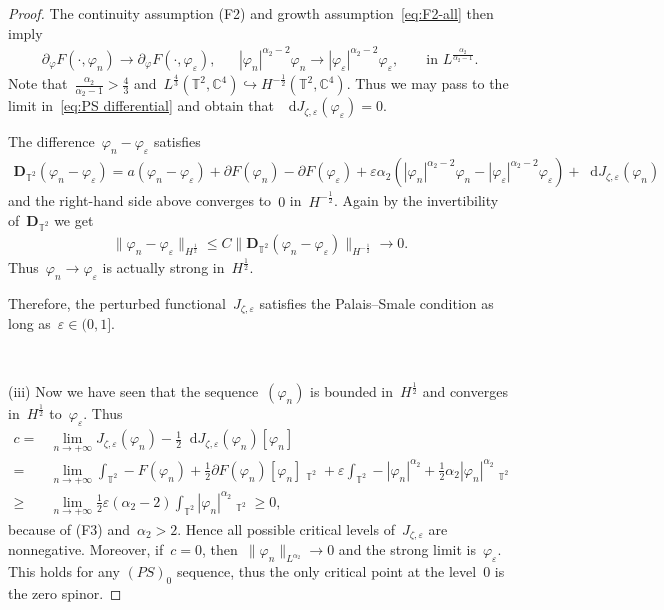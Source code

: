 \documentclass[11pt,final]{amsart}
\newcommand{\p}{\partial}
\newcommand{\C}{\mathbb{C}}
\newcommand{\T}{\mathbb{T}}
\newcommand{\dd}{\mathop{}\!\mathrm{d}}
\newcommand{\eps}{\varepsilon}
\newcommand{\pD}{\mathbf{D}}
\newcommand{\parenthesis}[1]{\left(#1\right)} %
\DeclareMathOperator{\dv}{\dd{vol}}
\begin{document}
\begin{proof}
    The continuity assumption (F2) and growth assumption~\eqref{eq:F2-all} then imply 
    \begin{align}
        \p_\varphi F(\cdot, \varphi_n) \to \p_\varphi F(\cdot,\varphi_\eps), & & 
        |\varphi_n|^{\alpha_2-2}\varphi_n \to |\varphi_\eps|^{\alpha_2-2} \varphi_\eps, & & 
        \mbox{ in  } L^{\frac{\alpha_2}{\alpha_2-1}}.
    \end{align}
    Note that~$\frac{\alpha_2}{\alpha_2-1}>\frac{4}{3}$ and~$L^{\frac{4}{3}}(\T^2,\C^4) \hookrightarrow H^{-\frac{1}{2}}(\T^2,\C^4)$.
    Thus we may pass to the limit in~\eqref{eq:PS differential} and obtain that~$\dd J_{\zeta,\eps}(\varphi_\eps)=0$. 
    
    

    The difference~$\varphi_n-\varphi_\eps$ satisfies
    \begin{align}
        \pD_{\T^2}(\varphi_n-\varphi_\eps)
        =a(\varphi_n-\varphi_\eps)+\partial F(\varphi_n)-\partial F(\varphi_\eps) + \eps \alpha_2 \parenthesis{|\varphi_n|^{\alpha_2-2} \varphi_n - |\varphi_\eps|^{\alpha_2-2}\varphi_\eps }  + \dd J_{\zeta,\eps}(\varphi_n)
    \end{align}
    and the right-hand side above converges to~$0$ in~$H^{-\frac{1}{2}}$. 
    Again by the invertibility of~$\pD_{\T^2}$ we get 
    \begin{align}
        \|\varphi_n-\varphi_\eps\|_{H^{\frac{1}{2}}} \leq C\|\pD_{\T^2}(\varphi_n-\varphi_\eps)\|_{H^{-\frac{1}{2}}} \to 0.
    \end{align}
    Thus~$\varphi_n \to \varphi_\eps$ is actually strong in~$H^{\frac{1}{2}}$. 

    Therefore, the perturbed functional~$J_{\zeta,\eps}$ satisfies the Palais--Smale condition as long as~$\eps\in (0,1]$.

    \

    (iii) Now we have seen that the sequence~$(\varphi_n)$ is bounded in~$H^{\frac{1}{2}}$ and converges in~$H^{\frac{1}{2}}$ to~$\varphi_\eps$. 
    Thus
    \begin{align}
        c=&\lim_{n\to+\infty} J_{\zeta,\eps}(\varphi_n) - \frac{1}{2}\dd J_{\zeta,\eps}(\varphi_n)[\varphi_n] \\
        =&\lim_{n\to+\infty} \int_{\T^2} -F(\varphi_n)+\frac{1}{2}\partial F(\varphi_n)[\varphi_n]\dv_{\T^2}
           +\eps\int_{\T^2} -|\varphi_n|^{\alpha_2} +\frac{1}{2}\alpha_2|\varphi_n|^{\alpha_2}\dv_{\T^2} \\
        \geq & \lim_{n\to+\infty}\frac{1}{2}\eps(\alpha_2-2)\int_{\T^2} |\varphi_n|^{\alpha_2}\dv_{\T^2} \geq 0,
    \end{align}
    because of (F3) and~$\alpha_2>2$.
    Hence all possible critical levels of~$J_{\zeta,\eps}$ are nonnegative.
    Moreover, if~$c=0$, then~$\|\varphi_n\|_{L^{\alpha_2}}\to 0$ and the strong limit is~$\varphi_\eps$. 
    This holds for any $(PS)_0$ sequence, thus the only critical point at the level~$0$ is the zero spinor. 
\end{proof}
\end{document}
